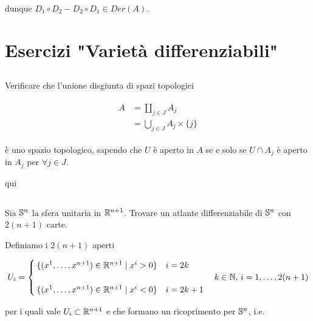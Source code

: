 dunque $ D_{1} \circ D_{2} - D_{2} \circ D_{1} \in Der(A) $.

\chapter{Esercizi "Varietà differenziabili"}

\tocless\section{}\label{BONUS2-1}

\begin{tcolorbox}
	Verificare che l'unione disgiunta di spazi topologici
	
	\begin{align}
		\begin{split}
			A &= \coprod_{j \in J} A_{j}\\
			&= \bigcup_{j \in J} A_{j} \times \{j\}
		\end{split}
	\end{align}
	
	è uno spazio topologico, sapendo che $ U $ è aperto in $ A $ se e solo se $ U \cap A_{j} $ è aperto in $ A_{j} $ per $ \forall j \in J $.
\end{tcolorbox}

qui

\tocless\section{}\label{es2-1}

\begin{tcolorbox}
	Sia $ \S^{n} $ la sfera unitaria in $ \R^{n+1} $. Trovare un atlante differenziabile di $ \S^{n} $ con $ 2(n+1) $ carte.

\end{tcolorbox}

Definiamo i $ 2(n+1) $ aperti

\begin{equation}
	U_{i} = %
	\begin{cases}
		\{ (x^{1},\dots,x^{n+1}) \in \R^{n+1} \mid x^{i} > 0 \} & i = 2k\\\\
		\{ (x^{1},\dots,x^{n+1}) \in \R^{n+1} \mid x^{i} < 0 \} & i = 2k+1
	\end{cases}%
	\quad k \in \N, \, i = 1,\dots,2(n+1)
\end{equation}

per i quali vale $ U_{i} \subset \R^{n+1} $ e che formano un ricoprimento per $ \S^{n} $, i.e.

